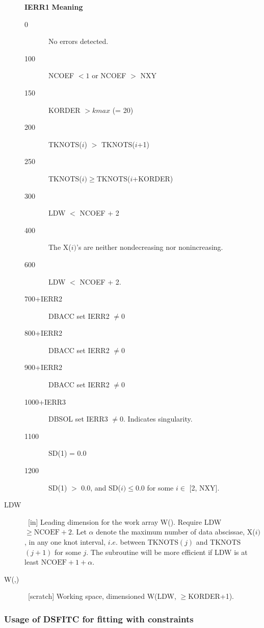 \documentclass[twoside]{MATH77}
\begin{document}
\begin{description}
{\bf IERR1} \hspace{.4in} {\bf Meaning}\vspace{-6pt}
\begin{description}
\item[\rm \phantom{100}0] \ No errors detected.
\item[\rm \phantom{1}100] \  NCOEF $<1$ or NCOEF $>$ NXY
\item[\rm \phantom{1}150] \  KORDER $>kmax$ (= 20)
\item[\rm \phantom{1}200] \  TKNOTS($i$) $>$ TKNOTS($i$+1)
\item[\rm \phantom{1}250] \  TKNOTS($i)\geq $TKNOTS($i$+KORDER)
\item[\rm \phantom{1}300] \  LDW $<$ NCOEF + 2
\item[\rm \phantom{1}400] \  The X($i)$'s are neither nondecreasing nor
nonincreasing.
\item[\rm \phantom{1}600] \  LDW $<$ NCOEF + 2.
\item[\rm \phantom{1}700+IERR2] \ DBACC set IERR2 $\neq 0$
\item[\rm \phantom{1}800+IERR2] \ DBACC set IERR2 $\neq 0$
\item[\rm \phantom{1}900+IERR2] \ DBACC set IERR2 $\neq 0$
\item[\rm 1000+IERR3] \ DBSOL set IERR3 $\neq 0$. Indicates singularity.
\item[\rm 1100] \  SD(1) = 0.0
\item[\rm 1200] \  SD(1) $>$ 0.0, and SD($i) \leq 0.0$ for some $i \in $ {[2,
NXY]}.
\end{description}
\item[LDW]  \ [in] Leading dimension for the work array W(). Require LDW $%
\geq \text{NCOEF}+2$. Let $\alpha $ denote the maximum number of data
abscissae, X($i)$, in any one knot interval, $i.e$. between TKNOTS$(j)$ and
TKNOTS$(j+1)$ for some $j$. The subroutine will be more efficient if LDW is
at least $\text{NCOEF}+1+\alpha .$

\item[W(,)]  \ [scratch] Working space, dimensioned W(LDW, $\geq $KORDER+1).
\end{description}
\subsubsection{Usage of DSFITC for fitting with constraints\label{dsfitc}}
\end{document}
